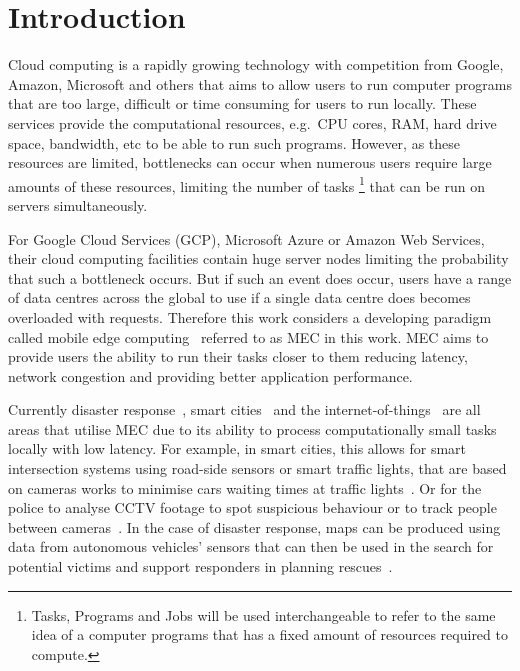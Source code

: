 \chapter{Introduction}\label{ch:project-problem}
Cloud computing is a rapidly growing technology with competition from Google, Amazon, Microsoft and others that aims to
allow users to run computer programs that are too large, difficult or time consuming for users to run locally.
These services provide the computational resources, e.g.\ CPU cores, RAM, hard drive space, bandwidth, etc
to be able to run such programs. However, as these resources are limited, bottlenecks can occur when
numerous users require large amounts of these resources, limiting the number of tasks
\footnote{Tasks, Programs and Jobs will be used interchangeable to refer to the same idea of a computer programs that
has a fixed amount of resources required to compute.} that can be run on servers simultaneously.

For Google Cloud Services (GCP), Microsoft Azure or Amazon Web Services, their cloud computing facilities contain huge
server nodes limiting the probability that such a bottleneck occurs. But if such an event does occur, users
have a range of data centres across the global to use if a single data centre does becomes overloaded with requests.
Therefore this work considers a developing paradigm~\citep{mobile_edge_survey} called mobile edge
computing~\citep{hu2015mobile} referred to as MEC in this work. MEC aims to provide users the ability to run their
tasks closer to them reducing latency, network congestion and providing better application performance.

Currently disaster response~\citep{mobile_edge_disaster}, smart cities~\citep{smart_disaster_management} and the
internet-of-things~\citep{mobile_edge_IoT} are all areas that utilise MEC due to its ability
to process computationally small tasks locally with low latency. For example, in smart cities, this
allows for smart intersection systems using road-side sensors or smart traffic lights, that are based
on cameras works to minimise cars waiting times at traffic lights~\citep{smart_cities_traffic_lights}. Or for the
police to analyse CCTV footage to spot suspicious behaviour or to track people between cameras~\citep{Sreenu2019}.
In the case of disaster response, maps can be produced using data from autonomous vehicles' sensors that can then be
used in the search for potential victims and support responders in planning rescues~\citep{smart_disaster_management}.

